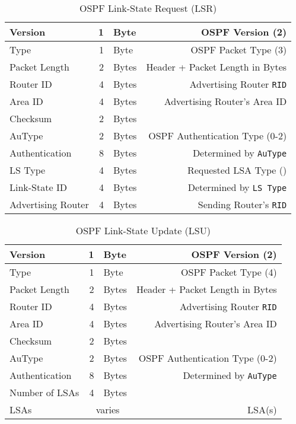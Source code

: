 \documentclass[12pt]{article}
\newcommand{\mc}[3]{\multicolumn{#1}{#2}{#3}}
\begin{document}
	\begin{table}[H]
	\centering
	\caption{OSPF Link-State Request (LSR) \label{tab:OSPF LSR}}
	\begin{tabular}{| l | r @{ } l | r |}\hline
	Version			& 1	& Byte	& OSPF Version (2)\\\hline
	Type				& 1	& Byte	& OSPF Packet Type (3)\\\hline
	Packet Length		& 2	& Bytes	& Header + Packet Length in Bytes\\\hline
	Router ID			& 4	& Bytes	& Advertising Router \texttt{RID}\\\hline
	Area ID			& 4	& Bytes	& Advertising Router's Area ID\\\hline
	Checksum			& 2	& Bytes	&\\\hline
	AuType			& 2	& Bytes	& OSPF Authentication Type (0-2)\\\hline
	Authentication		& 8	& Bytes	& Determined by \texttt{AuType}\\\hline
	LS Type			& 4	& Bytes	& Requested LSA Type (\Cref{tab:OSPF LSA TYPES})\\\hline
	Link-State ID		& 4	& Bytes	& Determined by \texttt{LS Type}\\\hline
	Advertising Router	& 4	& Bytes	& Sending Router's \texttt{RID}\\\hline
	\end{tabular}\end{table}

	\begin{table}[H]
	\centering
	\caption{OSPF Link-State Update (LSU) \label{tab:OSPF LSU}}
	\begin{tabular}{| l | r @{ } l | r |}\hline
	Version		& 1	& Byte		& OSPF Version (2)\\\hline
	Type			& 1	& Byte		& OSPF Packet Type (4)\\\hline
	Packet Length	& 2	& Bytes		& Header + Packet Length in Bytes\\\hline
	Router ID		& 4	& Bytes		& Advertising Router \texttt{RID}\\\hline
	Area ID		& 4	& Bytes		& Advertising Router's Area ID\\\hline
	Checksum		& 2	& Bytes		&\\\hline
	AuType		& 2	& Bytes		& OSPF Authentication Type (0-2)\\\hline
	Authentication	& 8	& Bytes		& Determined by \texttt{AuType}\\\hline
	Number of LSAs	& 4	& Bytes		&\\\hline
	LSAs			& \mc{2}{c|}{varies}	& LSA(s)\\\hline
	\end{tabular}\end{table}
\end{document}
